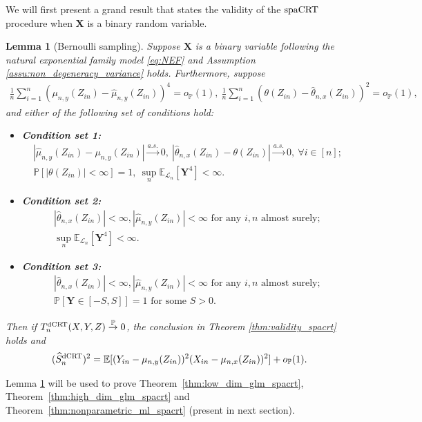 \documentclass[12pt]{article}
\newtheorem{lemma}{Lemma}
\theoremstyle{definition}
\def\P{\mathbb{P}}
\def\P{\mathbb{P}}
\newcommand{\E}{\mathbb E}								%
\renewcommand{\P}{\mathbb{P}}							%
\newcommand{\convp}{\overset{\mathbb{P}}{\rightarrow}}             %
\newcommand{\prx}{\bm X}								%
\newcommand{\srx}{X}									%
\newcommand{\srz}{Z}									%
\newcommand{\pry}{{\bm Y}}								%
\newcommand{\sry}{Y}									%
\newcommand{\law}{\mathcal L}							%
\newcommand{\dCRT}{\textnormal{dCRT}} 					%
\newcommand{\spacrt}{\textnormal{spaCRT}}               %
\begin{document}
We will first present a grand result that states the validity of the $\spacrt$ procedure when $\prx$ is a binary random variable. 

\begin{lemma}[Bernoulli sampling]\label{lem:bernoulli_case}
	Suppose $\prx$ is a binary variable following the natural exponential family model \eqref{eq:NEF} and Assumption \ref{assu:non_degeneracy_variance} holds. Furthermore, suppose 
	\begin{align}\label{eq:Lyap-consistency}
		\frac{1}{n}\sum_{i=1}^n (\mu_{n,y}(\srz_{in})-\widehat{\mu}_{n,y}(\srz_{in}))^{4}=o_{\P}(1),\ \frac{1}{n}\sum_{i=1}^n (\theta(\srz_{in})-\widehat \theta_{n,x}(\srz_{in}))^{2}=o_{\P}(1),
	\end{align}
  and either of the following set of conditions hold:
  \begin{itemize}
	\item \textbf{Condition set 1:} 
	\begin{align}
	  |\widehat{\mu}_{n,y}(\srz_{in})-\mu_{n,y}(\srz_{in})|\overset{a.s.}{\rightarrow}0,\ |\widehat \theta_{n,x}(\srz_{in})-\theta(\srz_{in})|\overset{a.s.}{\rightarrow}0,\ \forall i\in [n]\label{eq:almost-sure-convergence};\\
	  \P[|\theta(\srz_{in})|<\infty]=1,\ \sup_n\E_{\law_n}[\pry^4]<\infty\label{eq:bounded_moment_y}.
	\end{align}
	\item \textbf{Condition set 2:}
	\begin{align}
	  |\widehat \theta_{n,x}(\srz_{in})|<\infty,|\widehat \mu_{n,y}(\srz_{in})|<\infty\text{ for any $i,n$ almost surely};\label{eq:almost_sure_bound_NB_case}\\
	  \sup_n\E_{\law_n}[\pry^4]<\infty\label{eq:bounded_moment_y_NB_case}.
	\end{align}
	\item \textbf{Condition set 3:}
	\begin{align}
	  |\widehat \theta_{n,x}(\srz_{in})|<\infty,|\widehat \mu_{n,y}(\srz_{in})|<\infty\text{ for any $i,n$ almost surely};\label{eq:almost_sure_bound}\\
	  \P[\pry\in[-S,S]]=1\text{ for some }S>0.\label{eq:compact_support_y}
	\end{align}
  \end{itemize}
	Then if $T_n^{\dCRT}(\srx,\sry,\srz)\convp 0$, the conclusion in Theorem \ref{thm:validity_spacrt} holds and 
  \begin{align}\label{eq:dCRT_variance_convergence}
	(\widehat{S}_n^{\dCRT})^2=\E[(\sry_{in}-\mu_{n,y}(\srz_{in}))^2(\srx_{in}-\mu_{n,x}(\srz_{in}))^2]+o_{\P}(1).
  \end{align}
\end{lemma}
\noindent Lemma \ref{lem:bernoulli_case} will be used to prove Theorem~\ref{thm:low_dim_glm_spacrt}, Theorem~\ref{thm:high_dim_glm_spacrt} and Theorem~\ref{thm:nonparametric_ml_spacrt} (present in next section).
\end{document}
